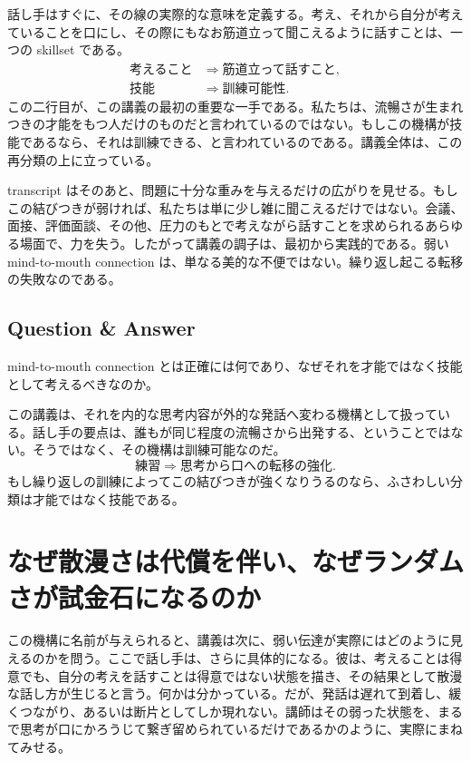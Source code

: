 話し手はすぐに、その線の実際的な意味を定義する。考え、それから自分が考えていることを口にし、その際にもなお筋道立って聞こえるように話すことは、一つの skillset である。
\begin{align}
\text{考えること} &\Longrightarrow \text{筋道立って話すこと},\\
\text{技能} &\Longrightarrow \text{訓練可能性}.
\end{align}
この二行目が、この講義の最初の重要な一手である。私たちは、流暢さが生まれつきの才能をもつ人だけのものだと言われているのではない。もしこの機構が技能であるなら、それは訓練できる、と言われているのである。講義全体は、この再分類の上に立っている。

transcript はそのあと、問題に十分な重みを与えるだけの広がりを見せる。もしこの結びつきが弱ければ、私たちは単に少し雑に聞こえるだけではない。会議、面接、評価面談、その他、圧力のもとで考えながら話すことを求められるあらゆる場面で、力を失う。したがって講義の調子は、最初から実践的である。弱い mind-to-mouth connection は、単なる美的な不便ではない。繰り返し起こる転移の失敗なのである。

\subsection{Question \& Answer}

mind-to-mouth connection とは正確には何であり、なぜそれを才能ではなく技能として考えるべきなのか。

この講義は、それを内的な思考内容が外的な発話へ変わる機構として扱っている。話し手の要点は、誰もが同じ程度の流暢さから出発する、ということではない。そうではなく、その機構は訓練可能なのだ。
\begin{equation}
\text{練習} \Longrightarrow \text{思考から口への転移の強化}.
\end{equation}
もし繰り返しの訓練によってこの結びつきが強くなりうるのなら、ふさわしい分類は才能ではなく技能である。

\section{なぜ散漫さは代償を伴い、なぜランダムさが試金石になるのか}

この機構に名前が与えられると、講義は次に、弱い伝達が実際にはどのように見えるのかを問う。ここで話し手は、さらに具体的になる。彼は、考えることは得意でも、自分の考えを話すことは得意ではない状態を描き、その結果として散漫な話し方が生じると言う。何かは分かっている。だが、発話は遅れて到着し、緩くつながり、あるいは断片としてしか現れない。講師はその弱った状態を、まるで思考が口にかろうじて繋ぎ留められているだけであるかのように、実際にまねてみせる。


